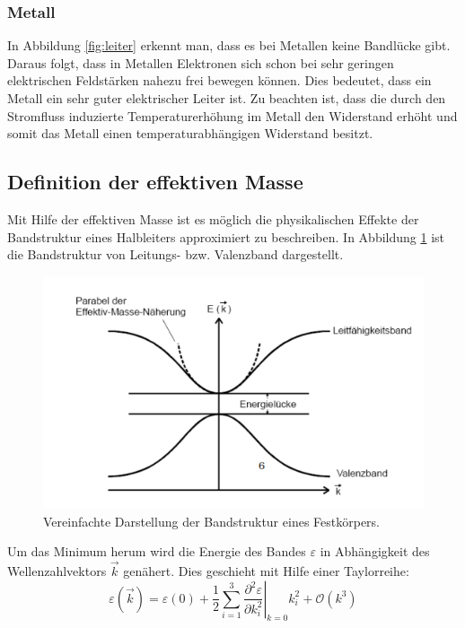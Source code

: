 \subsubsection{Metall}
In Abbildung \ref{fig:leiter} erkennt man, dass es bei Metallen keine Bandlücke gibt. Daraus folgt, dass in Metallen Elektronen sich schon bei sehr geringen elektrischen Feldstärken nahezu frei bewegen können. Dies bedeutet, dass ein Metall ein sehr guter
elektrischer Leiter ist. Zu beachten ist, dass die durch den Stromfluss induzierte Temperaturerhöhung im Metall den Widerstand erhöht und somit das Metall einen temperaturabhängigen Widerstand besitzt.
\subsection{Definition der effektiven Masse}
\label{sec:effektive_masse}
Mit Hilfe der effektiven Masse ist es möglich die physikalischen Effekte der Bandstruktur eines Halbleiters approximiert zu beschreiben. In Abbildung \ref{fig:band} ist die Bandstruktur von Leitungs- bzw. Valenzband dargestellt.
\begin{figure}
  \centering
  \includegraphics[scale=0.7]{fig/band.png}
  \caption{Vereinfachte Darstellung der Bandstruktur eines Festkörpers. \cite[6]{Bild2}}
  \label{fig:band}
\end{figure}
Um das Minimum herum wird die Energie des Bandes $\varepsilon$ in Abhängigkeit des Wellenzahlvektors $\vec{k}$ genähert. Dies geschieht mit Hilfe einer Taylorreihe:
\begin{equation}
  \label{eqn:energiegl}
  \varepsilon(\vec{k})=\varepsilon(0) + \frac{1}{2}\sum_{i=1}^3 \left.\frac{\partial^2 \varepsilon}{\partial k_i^2}\right|_{k=0}k_i^2 + \mathcal{O}(k^3)
\end{equation}
